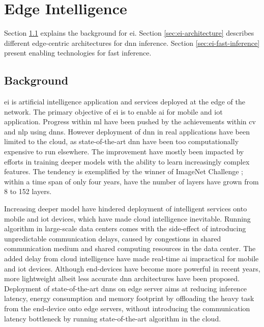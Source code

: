 \hypertarget{Edge Intelligence}{%
	\chapter{Edge Intelligence}\label{ch:edgeintelligence}}
\thispagestyle{fancy}


Section \ref{sec:ei-background} explains the background for \acrlong{ei}. Section \ref{sec:ei-architecture} describes different edge-centric architectures for \gls{dnn} inference. Section \ref{sec:ei-fast-inference} present enabling technologies for fast inference.


\section{Background}\label{sec:ei-background}

\acrlong{ei} is artificial intelligence application and services deployed at the edge of the network. The primary objective of \gls{ei} is to enable \gls{ai} for mobile and \gls{iot} application. Progress within \gls{ml} have been pushed by the achievements within \gls{cv} and \gls{nlp} using \gls{dnn}s. However deployment of \gls{dnn} in real applications have been limited to the cloud, as state-of-the-art \gls{dnn} have been too computationally expensive to run elsewhere. The improvement have mostly been impacted by efforts in training deeper models with the ability to learn increasingly complex features. The tendency is exemplified by the winner of ImageNet Challenge \cite{russakovsky_imagenet_2015}; within a time span of only four years, have the number of layers have grown from 8 to 152 layers. 

Increasing deeper model have hindered deployment of intelligent services onto mobile and \gls{iot} devices, which have made cloud intelligence inevitable. Running algorithm in large-scale data centers comes with the side-effect of introducing unpredictable communication delays, caused by congestions in shared communication medium and shared computing resources in the data center. The added delay from cloud intelligence have made real-time \gls{ai} impractical for mobile and \gls{iot} devices. Although end-devices have become more powerful in recent years, more lightweight albeit less accurate \gls{dnn} architectures have been proposed. Deployment of state-of-the-art \gls{dnn}s on edge server aims at reducing inference latency, energy consumption and memory footprint by offloading the heavy task from the end-device onto edge servers, without introducing the communication latency bottleneck by running state-of-the-art algorithm in the cloud. 

